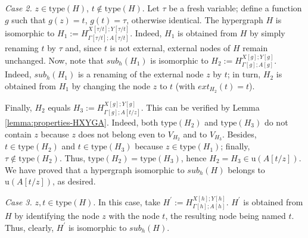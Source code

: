 \documentclass[a4paper,UKenglish,cleveref, autoref, thm-restate,pdfa]{lipics-v2021}
\newcommand{\eqdef}{:=}
\newcommand{\ext}{\mathit{ext}}
\newcommand{\type}{\mathrm{type}}
\newcommand{\sub}{\mathit{sub}}
\begin{document}
\textit{Case 2.} $z \in \type(H)$, $t \notin \type(H)$. Let $\tau$ be a fresh variable; define a function $g$ such that $g(z)=t$, $g(t)=\tau$, otherwise identical. The hypergraph $H$ is isomorphic to $H_1 \eqdef H^{X[\tau/t];Y[\tau/t]}_{\Gamma[\tau/t];A[\tau/t]}$. Indeed, $H_1$ is obtained from $H$ by simply renaming $t$ by $\tau$ and, since $t$ is not external, external nodes of $H$ remain unchanged. Now, note that $\sub_h(H_1)$ is isomorphic to $H_2 \eqdef H^{X[g];Y[g]}_{\Gamma[g];A[g]}$. Indeed, $\sub_h(H_1)$ is a renaming of the external node $z$ by $t$; in turn, $H_2$ is obtained from $H_1$ by changing the node $z$ to $t$ (with $\ext_{H_2}(t)=t$).

Finally, $H_2$ equals $H_3 \eqdef H^{X[g];Y[g]}_{\Gamma[g];A[t/z]}$. This can be verified by Lemma \ref{lemma:properties-HXYGA}. Indeed, both $\type(H_2)$ and $\type(H_3)$ do not contain $z$ because $z$ does not belong even to $V_{H_2}$ and to $V_{H_3}$. Besides, $t \in \type(H_2)$ and $t \in \type(H_3)$ because $z \in \type(H_1)$; finally, $\tau \notin \type(H_2)$. Thus, $\type(H_2) = \type(H_3)$, hence $H_2=H_3 \in \mathrm{u}(A[t/z])$. We have proved that a hypergraph isomorphic to $\sub_h(H)$ belongs to $\mathrm{u}(A[t/z])$, as desired.

\textit{Case 3.} $z,t \in \type(H)$. In this case, take $H^\prime \eqdef H^{X[h];Y[h]}_{\Gamma[h];A[h]}$. $H^\prime$ is obtained from $H$ by identifying the node $z$ with the node $t$, the resulting node being named $t$. Thus, clearly, $H^\prime$ is isomorphic to $\sub_h(H)$.
\end{document}
